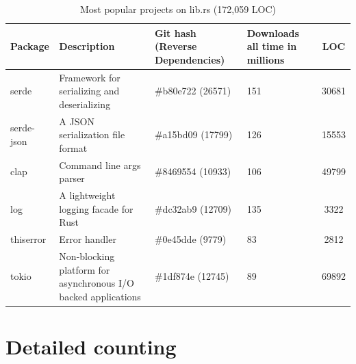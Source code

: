 \documentclass[nomenclature, english, bibtex]{kththesis}
\begin{document}
{\begin{table}[ht!]
\footnotesize
\centering
\caption[Most popular projects on lib.rs]{Most popular projects on lib.rs (172,059 LOC)}
\label{tab:lib_rs}
\renewcommand{\arraystretch}{1.5}
\begin{tabular}{ |l|>{\raggedright}p{4cm}|>{\raggedright}p{3cm}|>{\centering\arraybackslash}p{1.8cm}| S[table-format=7.0]| }
\hline
{}
\textbf{Package}& \textbf{Description} & \textbf{Git hash} \newline \textbf{(Reverse Dependencies)}&\textbf{Downloads} \newline \textbf{all time in millions} & \textbf{LOC}\\
\hline
serde & Framework for serializing and deserializing & \#b80e722 (\num{26571}) & \num{151} & \num{30681} \\
\hline
serde-json & A JSON serialization file format & \#a15bd09 (\num{17799}) & \num{126} & \num{15553} \\
\hline
clap & Command line args parser & \#8469554 (\num{10933}) & \num{106} & \num{49799} \\
\hline
log & A lightweight logging facade for Rust & \#dc32ab9 (\num{12709}) & \num{135} & \num{3322} \\
\hline
thiserror & Error handler & \#0e45dde (\num{9779}) & \num{83} & \num{2812} \\
\hline
tokio & Non-blocking platform for asynchronous I/O backed applications & \#1df874e (\num{12745}) & \num{89} & \num{69892} \\
\hline
\end{tabular}
\end{table}
\FloatBarrier
\clearpage
\section{Detailed counting}

\EXPDATA 

}
\end{document}

